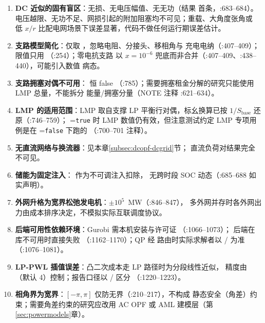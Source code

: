 \begin{enumerate}
  \item \textbf{DC 近似的固有盲区}：无损、无电压幅值、无无功（结果
         首条，:683--684）。
        电压越限、无功不足、网损引起的附加阻塞均不可见；重载、大角度张角或
        低 $x/r$ 比配电网场景下误差显著，代码不做任何运行期误差估计。
  \item \textbf{支路模型简化}：仅取 ，忽略电阻、分接头、移相角与
        充电电纳（:407--409）；限值只用 （:254）；零电抗支路
        以 $x=10^{-6}$ 兜底而非合并（:407--409、:438--440），可能引入数值
        病态。
  \item \textbf{支路拥塞对偶不可用}： 恒 false
        （:785）；需要拥塞租金分解的研究只能使用 LMP 总量，不能拆分
        能量/拥塞分量（NOTE 注释 :621--634）。
  \item \textbf{LMP 的适用范围}：LMP 取自支撑 LP 平衡行对偶，标幺换算已按
        $1/S_{\mathrm{base}}$ 还原（:746--759）；
        =\texttt{true} 时 LMP 数值仍有效，但注意测试约定 LMP 专项用例是在
        =\texttt{false} 下跑的
        （:700--701 注释）。
  \item \textbf{无直流网络与换流器}：见本章\ref{subsec:dcopf-dcgrid}节；
        直流负荷对结果完全不可见。
  \item \textbf{储能为固定注入}： 作为不可调注入扣除，
        无跨时段 SOC 动态（:685--688 如实声明）。
  \item \textbf{外网升格为宽界松弛发电机}：$\pm 10^{5}$~MW（:846--847），
        多外网并存时各外网出力由成本排序决定，不模拟实际互联调度协议。
  \item \textbf{后端可用性依赖环境}：Gurobi 需本机安装与许可证
        （:1066--1073）； 后端在库不可用时直接失败
        （:1162--1170）；QP 经  路由时实际求解者以
        / 为准（:1076--1081）。
  \item \textbf{LP-PWL 插值误差}：凸二次成本走 LP 路径时为分段线性近似，
        精度由 （默认 4）控制；报告口径以
        / 区分
        （:1220--1223）。
  \item \textbf{相角界为宽界}：$[-\pi,\pi]$ 仅防无界（:210--217），不构成
        静态安全（角差）约束；需要角差约束的研究应改用
        AC OPF 或 AML 建模层（第\ref{sec:powermodels}章）。
\end{enumerate}

